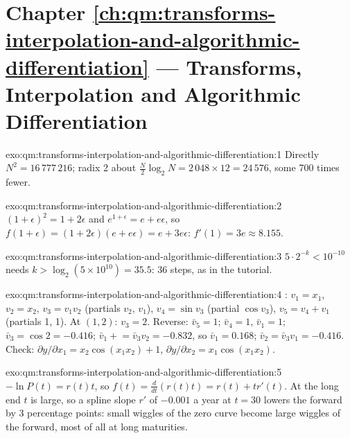\section*{Chapter \ref{ch:qm:transforms-interpolation-and-algorithmic-differentiation} --- Transforms, Interpolation and Algorithmic Differentiation}

\begin{solution}{exo:qm:transforms-interpolation-and-algorithmic-differentiation:1}
Directly $N^2 = 16\,777\,216$; radix 2 about $\frac N2\log_2N = 2\,048 \times 12 = 24\,576$, some 700 times fewer.
\end{solution}

\begin{solution}{exo:qm:transforms-interpolation-and-algorithmic-differentiation:2}
$(1 + \epsilon)^2 = 1 + 2\epsilon$ and $e^{1+\epsilon} = e + e\epsilon$, so $f(1 + \epsilon) = (1 + 2\epsilon)(e + e\epsilon) = e + 3e\epsilon$: $f'(1) = 3e \approx 8.155$.
\end{solution}

\begin{solution}{exo:qm:transforms-interpolation-and-algorithmic-differentiation:3}
$5 \cdot 2^{-k} < 10^{-10}$ needs $k > \log_2(5 \times 10^{10}) = 35.5$: 36 steps, as in the tutorial.
\end{solution}

\begin{solution}{exo:qm:transforms-interpolation-and-algorithmic-differentiation:4}
: $v_1 = x_1$, $v_2 = x_2$, $v_3 = v_1v_2$ (partials $v_2$, $v_1$), $v_4 = \sin v_3$ (partial $\cos v_3$), $v_5 = v_4 + v_1$ (partials 1, 1). At $(1, 2)$: $v_3 = 2$. Reverse: $\bar v_5 = 1$; $\bar v_4 = 1$,
$\bar v_1 = 1$; $\bar v_3 = \cos2 = -0.416$; $\bar v_1 \mathrel{+}= \bar v_3v_2 = -0.832$, so $\bar v_1 = 0.168$; $\bar v_2 = \bar v_3v_1 = -0.416$. Check: $\partial y/\partial x_1 = x_2\cos(x_1x_2) + 1$, $\partial y/\partial x_2 = x_1\cos(x_1x_2)$.
\end{solution}

\begin{solution}{exo:qm:transforms-interpolation-and-algorithmic-differentiation:5}
$-\ln P(t) = r(t)t$, so $f(t) = \frac{d}{dt}(r(t)t) = r(t) + tr'(t)$. At the long end $t$ is large, so a spline slope $r'$ of $-0.001$ a year at $t = 30$ lowers the forward by 3 percentage points: small wiggles of the
zero curve become large wiggles of the forward, most of all at long maturities.
\end{solution}

